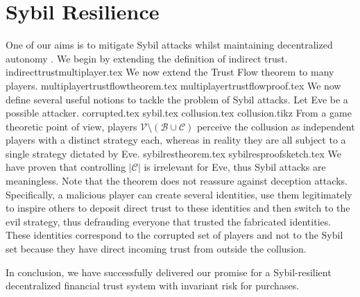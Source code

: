 \section{Sybil Resilience}
  One of our aims is to mitigate Sybil attacks \cite{sybilattack} whilst maintaining decentralized autonomy \cite{dionyziz}.
  We begin by extending the definition of indirect trust.
  {indirecttrustmultiplayer.tex}
  \noindent We now extend the Trust Flow theorem to many players.
  {multiplayertrustflowtheorem.tex}
  {multiplayertrustflowproof.tex}
  \noindent We now define several useful notions to tackle the problem of Sybil attacks. Let Eve be a possible attacker.
  {corrupted.tex}
  {sybil.tex}
  {collusion.tex}
  {collusion.tikz}
  From a game theoretic point of view, players $\mathcal{V} \setminus (\mathcal{B} \cup \mathcal{C})$ perceive the collusion
  as independent players with a distinct strategy each, whereas in reality they are all subject to a single strategy dictated
  by Eve.
  {sybilrestheorem.tex}
  {sybilresproofsketch.tex}
  We have proven that controlling $|\mathcal{C}|$ is irrelevant for Eve, thus Sybil attacks are meaningless. Note that
  the theorem does not reassure against deception attacks. Specifically, a malicious player can create several identities, use
  them legitimately to inspire others to deposit direct trust to these identities and then switch to the evil strategy, thus
  defrauding everyone that trusted the fabricated identities. These identities correspond to the corrupted set of players and
  not to the Sybil set because they have direct incoming trust from outside the collusion.

  In conclusion, we have successfully delivered our promise for a Sybil-resilient decentralized financial trust system with
  invariant risk for purchases.

